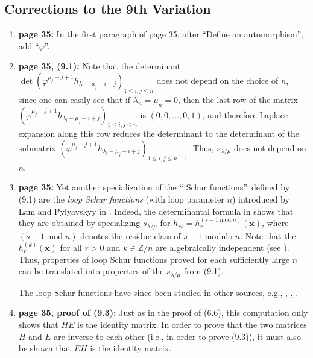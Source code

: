 \documentclass[numbers=enddot,12pt,final,onecolumn,notitlepage]{scrartcl}%
\theoremstyle{definition}
\begin{document}
\subsection{Corrections to the 9th Variation}

\begin{enumerate}
\item \textbf{page 35:} In the first paragraph of page 35, after
\textquotedblleft Define an automorphism\textquotedblright, add
\textquotedblleft$\varphi$\textquotedblright.

\item \textbf{page 35, (9.1):} Note that the determinant $\det\left(
\varphi^{\mu_{j}-j+1}h_{\lambda_{i}-\mu_{j}-i+j}\right)  _{1\leq i,j\leq n}$
does not depend on the choice of $n$, since one can easily see that if
$\lambda_{n}=\mu_{n}=0$, then the last row of the matrix $\left(  \varphi
^{\mu_{j}-j+1}h_{\lambda_{i}-\mu_{j}-i+j}\right)  _{1\leq i,j\leq n}$ is
$\left(  0,0,\ldots,0,1\right)  $, and therefore Laplace expansion along this
row reduces the determinant to the determinant of the submatrix $\left(
\varphi^{\mu_{j}-j+1}h_{\lambda_{i}-\mu_{j}-i+j}\right)  _{1\leq i,j\leq n-1}%
$. Thus, $s_{\lambda/\mu}$ does not depend on $n$.

\item \textbf{page 35:} Yet another specialization of the \textquotedblleft
Schur functions\textquotedblright\ defined by (9.1) are the \emph{loop Schur
functions} (with loop parameter $n$) introduced by Lam and Pylyavskyy in
\cite[\S 7.2]{LamPyl12}. Indeed, the determinantal formula in \cite[Theorem
7.4]{LamPyl12} shows that they are obtained by specializing $s_{\lambda/\mu}$
for $h_{rs}=h_{r}^{\left(  s-1\operatorname{mod}n\right)  }\left(
\mathbf{x}\right)  $, where $\left(  s-1\operatorname{mod}n\right)  $ denotes
the residue class of $s-1$ modulo $n$. Note that the $h_{r}^{\left(  k\right)
}\left(  \mathbf{x}\right)  $ for all $r>0$ and $k\in\mathbb{Z}/n$ are
algebraically independent (see \cite[Remark 7.1]{LamPyl12}). Thus, properties
of loop Schur functions proved for each sufficiently large $n$ can be
translated into properties of the $s_{\lambda/\mu}$ from (9.1).

The loop Schur functions have since been studied in other sources, e.g.,
\cite{Lam10}, \cite{Friede20}, \cite{Ross13}.

\item \textbf{page 35, proof of (9.3):} Just as in the proof of (6.6), this
computation only shows that $HE$ is the identity matrix. In order to prove
that the two matrices $H$ and $E$ are inverse to each other (i.e., in order to
prove (9.3)), it must also be shown that $EH$ is the identity matrix.


\end{enumerate}
\end{document}
